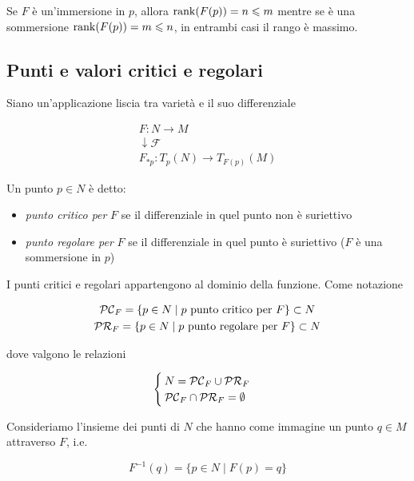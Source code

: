 \begin{remark}
	Se $ F $ è un'immersione in $ p $, allora $ \rank(F(p)) = n \leqslant m $ mentre se è una sommersione $ \rank(F(p)) = m \leqslant n $, in entrambi casi il rango è massimo.
\end{remark}

\subsection{Punti e valori critici e regolari}

Siano un'applicazione liscia tra varietà e il suo differenziale

\begin{gather}
	F : N \to M\\
	\downarrow \mathcal{F} \nonumber\\
	F_{*p} : T_{p}(N) \to T_{F(p)}(M)
\end{gather}

Un punto $ p \in N $ è detto:

\begin{itemize}
	\item \textit{punto critico per} $ F $ se il differenziale in quel punto non è suriettivo
	
	\item \textit{punto regolare per} $ F $ se il differenziale in quel punto è suriettivo ($ F $ è una sommersione in $ p $)
\end{itemize}

I punti critici e regolari appartengono al dominio della funzione. Come notazione

\begin{gather}
	\mathcal{PC}_{F} = \{ p \in N \mid p \text{ punto critico per } F \} \subset N\\
	\mathcal{PR}_{F} = \{ p \in N \mid p \text{ punto regolare per } F \} \subset N
\end{gather}

dove valgono le relazioni

\begin{equation}
	\begin{cases}
		N = \mathcal{PC}_{F} \cup \mathcal{PR}_{F}\\
		\mathcal{PC}_{F} \cap \mathcal{PR}_{F} = \emptyset
	\end{cases}
\end{equation}

Consideriamo l'insieme dei punti di $ N $ che hanno come immagine un punto $ q \in M $ attraverso $ F $, i.e.

\begin{equation}
	F^{-1}(q) = \{ p \in N \mid F(p) = q \}
\end{equation}

